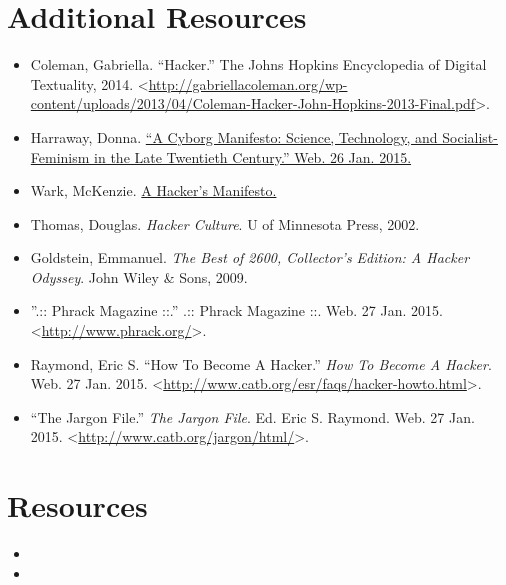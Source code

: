 \documentclass[letterpaper,12pt,english]{sphinxmanual}
\begin{document}
\chapter{Additional Resources}
\label{additional::doc}\label{additional:additional-resources}\begin{itemize}
\item {} 
Coleman, Gabriella. ``Hacker.'' The Johns Hopkins Encyclopedia of Digital Textuality, 2014. \textless{}\url{http://gabriellacoleman.org/wp-content/uploads/2013/04/Coleman-Hacker-John-Hopkins-2013-Final.pdf}\textgreater{}.

\item {} 
Harraway, Donna. \href{http://www.egs.edu/faculty/donna-haraway/articles/donna-haraway-a-cyborg-manifesto/}{``A Cyborg Manifesto: Science, Technology, and Socialist-Feminism in the Late Twentieth Century.'' Web. 26 Jan. 2015.}

\item {} 
Wark, McKenzie. \href{http://subsol.c3.hu/subsol\_2/contributors0/warktext.html}{A Hacker's Manifesto.}

\item {} 
Thomas, Douglas. \emph{Hacker Culture}. U of Minnesota Press, 2002.

\item {} 
Goldstein, Emmanuel. \emph{The Best of 2600, Collector's Edition: A Hacker Odyssey}. John Wiley \& Sons, 2009.

\item {} 
''.:: Phrack Magazine ::.'' .:: Phrack Magazine ::. Web. 27 Jan. 2015. \textless{}\url{http://www.phrack.org/}\textgreater{}.

\item {} 
Raymond, Eric S. ``How To Become A Hacker.'' \emph{How To Become A Hacker}. Web. 27 Jan. 2015. \textless{}\url{http://www.catb.org/esr/faqs/hacker-howto.html}\textgreater{}.

\item {} 
``The Jargon File.'' \emph{The Jargon File}. Ed. Eric S. Raymond. Web. 27 Jan. 2015. \textless{}\url{http://www.catb.org/jargon/html/}\textgreater{}.

\end{itemize}


\chapter{Resources}
\label{index:resources}\begin{itemize}
\item {} 

\item {} 

\end{itemize}



\renewcommand{\indexname}{Index}
\printindex
\end{document}
